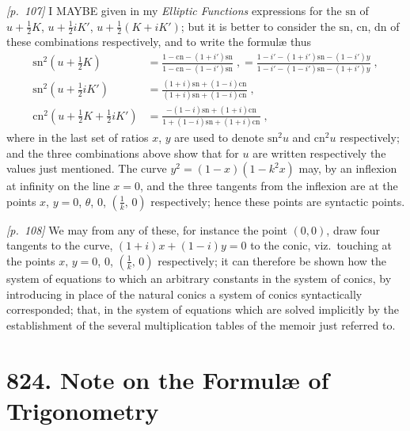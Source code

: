 \documentclass[11pt,a4paper]{book}
\begin{document}
\noindent\textit{[p.~107]} I MAYBE given in my \textit{Elliptic Functions} expressions for the $\mathrm{sn}$ of $u + \frac{1}{2}K$, $u + \frac{1}{2}iK'$, $u + \frac{1}{2}(K + iK')$; but it is better to consider the $\mathrm{sn}$, $\mathrm{cn}$, $\mathrm{dn}$ of these combinations respectively, and to write the formul\ae{} thus
\begin{align*}
\mathrm{sn}^2(u + \tfrac{1}{2}K) &= \frac{1 - \mathrm{cn} - (1 + i')\mathrm{sn}}{1 - \mathrm{cn} - (1 - i')\mathrm{sn}}\;, = \frac{1 - i' - (1 + i')\mathrm{sn} - (1 - i')y}{1 - i' - (1 - i')\mathrm{sn} - (1 + i')y}\;,\\
\mathrm{sn}^2(u + \tfrac{1}{2}iK') &= \frac{(1 + i)\mathrm{sn} + (1 - i)\mathrm{cn}}{(1 + i)\mathrm{sn} + (1 - i)\mathrm{cn}}\;,\\
\mathrm{cn}^2(u + \tfrac{1}{2}K + \tfrac{1}{2}iK') &= \frac{- (1 - i)\mathrm{sn} + (1 + i)\mathrm{cn}}{1 + (1 - i)\mathrm{sn} + (1 + i)\mathrm{cn}}\;,
\end{align*}
where in the last set of ratios $x$, $y$ are used to denote $\mathrm{sn}^2 u$ and $\mathrm{cn}^2 u$ respectively; and the three combinations above show that for $u$ are written respectively the values just mentioned. The curve $y^2 = (1 - x)(1 - k^2x)$ may, by an inflexion at infinity on the line $x = 0$, and the three tangents from the inflexion are at the points $x$, $y = 0$, $\theta$, $0$, $(\tfrac{1}{k},\,0)$ respectively; hence these points are syntactic points.

\bigskip\noindent\textit{[p.~108]} We may from any of these, for instance the point $(0, 0)$, draw four tangents to the curve, $(1 + i)x + (1 - i)y = 0$ to the conic, viz.\ touching at the points $x,\,y = 0$, $0$, $(\frac{1}{k},\,0)$ respectively; it can therefore be shown how the system of equations to which an arbitrary constants in the system of conics, by introducing in place of the natural conics a system of conics syntactically corresponded; that, in the system of equations which are solved implicitly by the establishment of the several multiplication tables of the memoir just referred to.

\bigskip

\section*{824. Note on the Formul\ae{} of Trigonometry}
\end{document}
